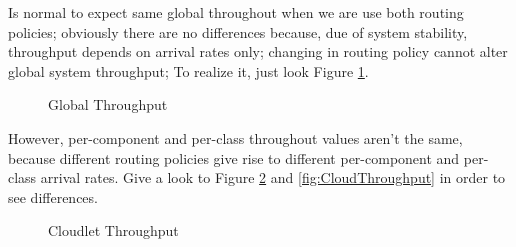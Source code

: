 \documentclass[10pt,a4paper]{article}
\begin{document}
Is normal to expect same global throughout when we are use both routing policies; obviously there are no differences because, due of system stability, throughput depends on arrival rates only; changing in routing policy cannot alter global system throughput; To realize it, just look Figure \ref{fig:Throughput}.

\begin{figure}[h!]
    \centering
    \caption{Global Throughput}%
    \label{fig:Throughput}
\end{figure}

However, per-component and per-class throughout values aren't the same, because different routing policies give rise to different per-component and per-class arrival rates. Give a look to Figure \ref{fig:CloudletThroughput} and \ref{fig:CloudThroughput} in order to see differences.

\begin{figure}[h!]
    \centering
    \caption{Cloudlet Throughput}%
    \label{fig:CloudletThroughput}
\end{figure}
\end{document}
